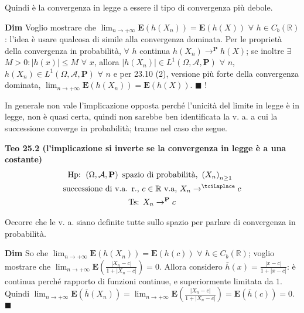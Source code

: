 \documentclass{article}
\begin{document}
Quindi \`{e} la convergenza in legge a essere il tipo di convergenza pi\`{u}
debole.

\textbf{Dim} Voglio mostrare che $\lim_{n\rightarrow +\infty }\mathbf{E}%
\left( h\left( X_{n}\right) \right) =\mathbf{E}\left( h\left( X\right)
\right) $ $\forall $ $h\in C_{b}\left( 
\mathbb{R}
\right) $: l'idea \`{e} usare qualcosa di simile alla convergenza dominata.
Per le propriet\`{a} della convergenza in probabilit\`{a}, $\forall $ $h$
continua $h\left( X_{n}\right) \rightarrow ^{\mathbf{P}}h\left( X\right) $;
se inoltre $\exists $ $M>0:\left\vert h\left( x\right) \right\vert \leq M$ $%
\forall $ $x$, allora $\left\vert h\left( X_{n}\right) \right\vert \in
L^{1}\left( \Omega ,\mathcal{A},\mathbf{P}\right) $ $\forall $ $n$, $h\left(
X_{n}\right) \in L^{1}\left( \Omega ,\mathcal{A},\mathbf{P}\right) $ $%
\forall $ $n$ e per 23.10 (2), versione pi\`{u} forte della convergenza
dominata, $\lim_{n\rightarrow +\infty }\mathbf{E}\left( h\left( X_{n}\right)
\right) =\mathbf{E}\left( h\left( X\right) \right) $. $\blacksquare $ !

In generale non vale l'implicazione opposta perch\'{e} l'unicit\`{a} del
limite in legge \`{e} in legge, non \`{e} quasi certa, quindi non sarebbe
ben identificata la v. a. a cui la successione converge in probabilit\`{a};
tranne nel caso che segue.

\textbf{Teo 25.2 (l'implicazione si inverte se la convergenza in legge \`{e}
a una costante)}%
\begin{gather*}
\text{Hp: }\left( \Omega ,\mathcal{A},\mathbf{P}\right) \text{ spazio di
probabilit\`{a}, }\left( X_{n}\right) _{n\geq 1}\text{ } \\
\text{successione di v.a. r., }c\in 
\mathbb{R}
\text{ v.a, }X_{n}\rightarrow ^{\tciLaplace }c \\
\text{Ts: }X_{n}\rightarrow ^{\mathbf{P}}c
\end{gather*}

Occorre che le v. a. siano definite tutte sullo spazio per parlare di
convergenza in probabilit\`{a}.

\textbf{Dim} So che $\lim_{n\rightarrow +\infty }\mathbf{E}\left( h\left(
X_{n}\right) \right) =\mathbf{E}\left( h\left( c\right) \right) $ $\forall $ 
$h\in C_{b}\left( 
\mathbb{R}
\right) $; voglio mostrare che $\lim_{n\rightarrow +\infty }\mathbf{E}\left( 
\frac{\left\vert X_{n}-c\right\vert }{1+\left\vert X_{n}-c\right\vert }%
\right) =0$. Allora considero $\bar{h}\left( x\right) =\frac{\left\vert
x-c\right\vert }{1+\left\vert x-c\right\vert }$: \`{e} continua perch\'{e}
rapporto di funzioni continue, e superiormente limitata da $1$. Quindi $%
\lim_{n\rightarrow +\infty }\mathbf{E}\left( \bar{h}\left( X_{n}\right)
\right) =\lim_{n\rightarrow +\infty }\mathbf{E}\left( \frac{\left\vert
X_{n}-c\right\vert }{1+\left\vert X_{n}-c\right\vert }\right) =\mathbf{E}%
\left( \bar{h}\left( c\right) \right) =0$. $\blacksquare $
\end{document}
